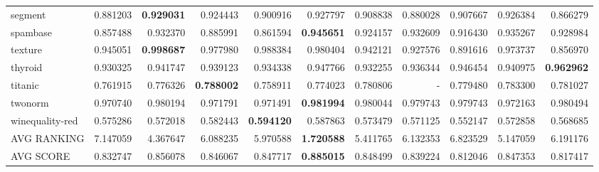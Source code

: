 \begin{tabular}{lrrrrrrrrrr}
segment         &   0.881203 &  \textbf{0.929031} &  0.924443 &  0.900916 &  0.927797 &  0.908838 &  0.880028 &  0.907667 &  0.926384 &  0.866279 \\
spambase        &   0.857488 &  0.932370 &  0.885991 &  0.861594 &  \textbf{0.945651} &  0.924157 &  0.932609 &  0.916430 &  0.935267 &  0.928984 \\
texture         &   0.945051 &  \textbf{0.998687} &  0.977980 &  0.988384 &  0.980404 &  0.942121 &  0.927576 &  0.891616 &  0.973737 &  0.856970 \\
thyroid         &   0.930325 &  0.941747 &  0.939123 &  0.934338 &  0.947766 &  0.932255 &  0.936344 &  0.946454 &  0.940975 &  \textbf{0.962962} \\
titanic         &   0.761915 &  0.776326 &  \textbf{0.788002} &  0.758911 &  0.774023 &  0.780806 &       - &  0.779480 &  0.783300 &  0.781027 \\
twonorm         &   0.970740 &  0.980194 &  0.971791 &  0.971491 &  \textbf{0.981994} &  0.980044 &  0.979743 &  0.979743 &  0.972163 &  0.980494 \\
winequality-red &   0.575286 &  0.572018 &  0.582443 &  \textbf{0.594120} &  0.587863 &  0.573479 &  0.571125 &  0.552147 &  0.572858 &  0.568685 \\
\bottomrule
AVG RANKING & 7.147059 & 4.367647 & 6.088235 & 5.970588 & \textbf{1.720588} & 5.411765 & 6.132353 & 6.823529 & 5.147059 & 6.191176 \\
AVG SCORE & 0.832747 & 0.856078 & 0.846067 & 0.847717 & \textbf{0.885015} & 0.848499 & 0.839224 & 0.812046 & 0.847353 & 0.817417 \\
\end{tabular}
